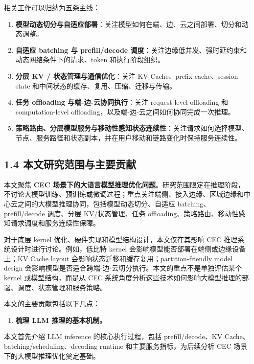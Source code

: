\documentclass[a4paper,twocolumn,10pt]{ctexart}
\begin{document}
相关工作可以归纳为五条主线：


\begin{enumerate}
\item \textbf{模型动态切分与自适应部署}：关注模型如何在端、边、云之间部署、切分和动态调整。

\item \textbf{自适应 batching 与 prefill/decode 调度}：关注边缘低并发、强时延约束和动态网络条件下的请求、token 和执行阶段组织。

\item \textbf{分层 KV / 状态管理与通信优化}：关注 KV Cache、prefix cache、session state 和中间状态的缓存、复用、压缩、迁移与传输。

\item \textbf{任务 offloading 与端-边-云协同执行}：关注 request-level offloading 和 computation-level offloading，以及端-边-云之间如何协同完成一次推理。

\item \textbf{策略路由、分层模型服务与移动性感知状态连续性}：关注请求如何选择模型、节点、服务路径和状态副本，并在用户移动和链路变化时保持服务连续性。

\end{enumerate}


\subsection{1.4 本文研究范围与主要贡献}

本文聚焦 \textbf{CEC 场景下的大语言模型推理优化问题}。研究范围限定在推理阶段，不讨论大模型训练、预训练或微调过程；重点关注端侧、接入边缘、区域边缘和中心云之间的大模型推理协同，包括模型动态切分、自适应 batching、prefill/decode 调度、分层 KV/状态管理、任务 offloading、策略路由、移动性感知请求调度和服务连续性保障。


对于底层 kernel 优化、硬件实现和模型结构设计，本文仅在其影响 CEC 推理系统设计时进行讨论。例如，低比特 kernel 会影响模型能否部署在端侧或边缘设备上；KV Cache layout 会影响状态迁移和缓存复用；partition-friendly model design 会影响模型是否适合跨端-边-云切分执行。本文的重点不是单独评估某个 kernel 或模型结构，而是从 CEC 系统角度分析这些技术如何影响大模型推理的部署、调度、状态管理和服务策略。


本文的主要贡献包括以下几点：


\begin{enumerate}
\item \textbf{梳理 LLM 推理的基本机制。}
\end{enumerate}
本文首先介绍 LLM inference 的核心执行过程，包括 prefill/decode、KV Cache、batching/scheduling、decoding runtime 和主要服务指标，为后续分析 CEC 场景下的大模型推理优化奠定基础。
\end{document}
